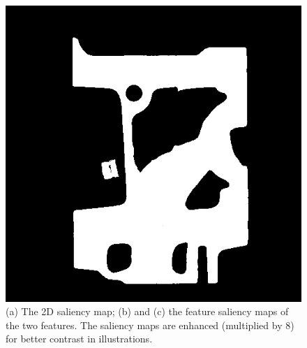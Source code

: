 \begin{figure}
\begin{minipage}{.33\textwidth}
	\end{minipage}~
	\begin{minipage}{.33\textwidth}
		\includegraphics[width=1\linewidth]{images/engine_naive_saliencemap_2_overlap}
	\end{minipage}
	\caption{(a) The 2D saliency map; (b) and (c) the feature saliency maps of the two features. The saliency maps are enhanced (multiplied by 8) for better contrast in illustrations.}
	\label{fig:engine_naive_saliencemap}
\end{figure}


